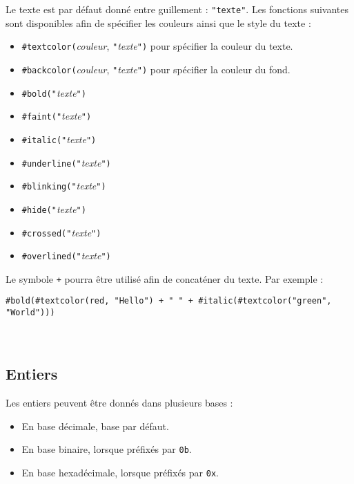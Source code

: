 \documentclass[french, 12pt]{article}
\begin{document}
Le texte est par défaut donné entre guillement : \texttt{"texte"}. Les
fonctions suivantes sont disponibles afin de spécifier les couleurs ainsi que
le style du texte :
\begin{itemize}
      \item \texttt{\#textcolor(}\textit{couleur}, \texttt{"}\textit{texte}\texttt{")} pour spécifier la couleur du texte.
      \item \texttt{\#backcolor(}\textit{couleur}, \texttt{"}\textit{texte}\texttt{")} pour spécifier la couleur du fond.
      \item \texttt{\#bold(}\texttt{"}\textit{texte}\texttt{")}
      \item \texttt{\#faint(}\texttt{"}\textit{texte}\texttt{")}
      \item \texttt{\#italic(}\texttt{"}\textit{texte}\texttt{")}
      \item \texttt{\#underline(}\texttt{"}\textit{texte}\texttt{")}
      \item \texttt{\#blinking(}\texttt{"}\textit{texte}\texttt{")}
      \item \texttt{\#hide(}\texttt{"}\textit{texte}\texttt{")}
      \item \texttt{\#crossed(}\texttt{"}\textit{texte}\texttt{")}
      \item \texttt{\#overlined(}\texttt{"}\textit{texte}\texttt{")}
\end{itemize}

Le symbole \texttt{+} pourra être utilisé afin de concaténer du texte.
Par exemple :
\begin{center}
      \noindent\texttt{\#bold(\#textcolor(red, "Hello") + " " + \#italic(\#textcolor("green", "World")))}  \\
      \textdownarrow\\
      \noindent\texttt{\textbf{\color{red}{Hello}} \textit{\color{green}{World}}}
\end{center}

\subsection*{Entiers}

Les entiers peuvent être donnés dans plusieurs bases :
\begin{itemize}
      \item En base décimale, base par défaut.
      \item En base binaire, lorsque préfixés par \texttt{0b}.
      \item En base hexadécimale, lorsque préfixés par \texttt{0x}.
\end{itemize}
\end{document}
